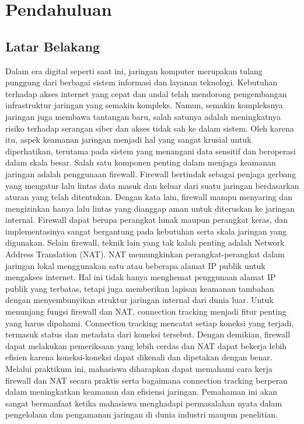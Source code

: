 \section{Pendahuluan}
\subsection{Latar Belakang}
Dalam era digital seperti saat ini, jaringan komputer merupakan tulang punggung dari berbagai sistem informasi dan layanan teknologi. Kebutuhan terhadap akses internet yang cepat dan andal telah mendorong pengembangan infrastruktur jaringan yang semakin kompleks. Namun, semakin kompleksnya jaringan juga membawa tantangan baru, salah satunya adalah meningkatnya risiko terhadap serangan siber dan akses tidak sah ke dalam sistem. Oleh karena itu, aspek keamanan jaringan menjadi hal yang sangat krusial untuk diperhatikan, terutama pada sistem yang menangani data sensitif dan beroperasi dalam skala besar. Salah satu komponen penting dalam menjaga keamanan jaringan adalah penggunaan firewall. Firewall bertindak sebagai penjaga gerbang yang mengatur lalu lintas data masuk dan keluar dari suatu jaringan berdasarkan aturan yang telah ditentukan. Dengan kata lain, firewall mampu menyaring dan mengizinkan hanya lalu lintas yang dianggap aman untuk diteruskan ke jaringan internal. Firewall dapat berupa perangkat lunak maupun perangkat keras, dan implementasinya sangat bergantung pada kebutuhan serta skala jaringan yang digunakan. Selain firewall, teknik lain yang tak kalah penting adalah Network Address Translation (NAT). NAT memungkinkan perangkat-perangkat dalam jaringan lokal menggunakan satu atau beberapa alamat IP publik untuk mengakses internet. Hal ini tidak hanya menghemat penggunaan alamat IP publik yang terbatas, tetapi juga memberikan lapisan keamanan tambahan dengan menyembunyikan struktur jaringan internal dari dunia luar. Untuk menunjang fungsi firewall dan NAT, connection tracking menjadi fitur penting yang harus dipahami. Connection tracking mencatat setiap koneksi yang terjadi, termasuk status dan metadata dari koneksi tersebut. Dengan demikian, firewall dapat melakukan pemeriksaan yang lebih cerdas dan NAT dapat bekerja lebih efisien karena koneksi-koneksi dapat dikenali dan dipetakan dengan benar. Melalui praktikum ini, mahasiswa diharapkan dapat memahami cara kerja firewall dan NAT secara praktis serta bagaimana connection tracking berperan dalam meningkatkan keamanan dan efisiensi jaringan. Pemahaman ini akan sangat bermanfaat ketika mahasiswa menghadapi permasalahan nyata dalam pengelolaan dan pengamanan jaringan di dunia industri maupun penelitian.

